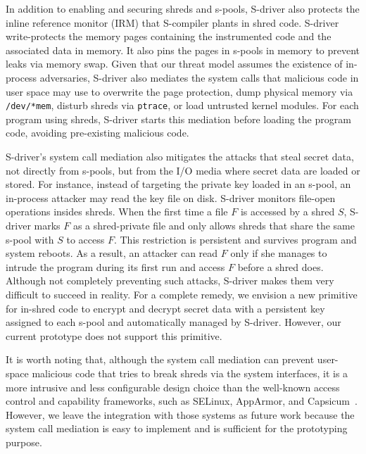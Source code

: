 In addition to enabling and securing shreds and s-pools, S-driver also protects the inline reference monitor (IRM) that S-compiler plants in shred code. 
S-driver write-protects the memory pages containing the instrumented code and the associated data in memory.
It also pins the pages in s-pools in memory to prevent leaks via memory swap.  
Given that our threat model assumes the existence of in-process adversaries, S-driver also mediates the system calls that malicious code in user space may use to overwrite the page protection, dump physical memory via {\tt /dev/*mem}, disturb shreds via {\tt ptrace}, or load untrusted kernel modules. 
For each program using shreds, S-driver starts this mediation before loading the program code, avoiding pre-existing malicious code. 

S-driver's system call mediation also mitigates the attacks that steal secret data, not directly from s-pools, but from the I/O media where secret data are loaded or stored. 
For instance, instead of targeting the private key loaded in an s-pool, an in-process attacker may read the key file on disk. 
S-driver monitors file-open operations insides shreds. When the first time a file $F$ is accessed by a shred $S$, S-driver marks $F$ as a shred-private file and only allows shreds that share the same s-pool with $S$ to access $F$. This restriction is persistent and survives program and system reboots. 
As a result, an attacker can read $F$ only if she manages to intrude the program during its first run and access $F$ before a shred does. Although not completely preventing such attacks, S-driver makes them very difficult to succeed in reality. 
For a complete remedy, we envision a new primitive for in-shred code to encrypt and decrypt secret data with a persistent key assigned to each s-pool and automatically managed by S-driver. However, our current prototype does not support this primitive. 


It is worth noting that, although the system call mediation can prevent user-space malicious code that tries to break shreds via the system interfaces, it is a more intrusive and less configurable design choice than the well-known access control and capability frameworks, such as SELinux, AppArmor, and Capsicum~\cite{watson2010capsicum}. 
However, we leave the integration with those systems as future work because the system call mediation is easy to implement and is sufficient for the prototyping purpose. 

